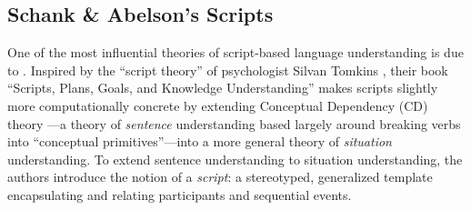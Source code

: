 \subsection{Schank \& Abelson's Scripts}
\label{sec:schank}


One of the most influential theories of script-based language understanding is due to \citet{schankandabelson}. Inspired by the ``script theory'' of psychologist Silvan Tomkins \citep{tomkins1978script}, their book ``Scripts, Plans, Goals, and Knowledge Understanding'' makes scripts slightly more computationally concrete by extending Conceptual Dependency (CD) theory \citep{schank1969conceptual}---a theory of \textit{sentence} understanding based largely around breaking verbs into ``conceptual primitives''---into a more general theory of \textit{situation} understanding. To extend sentence understanding to situation understanding, the authors introduce the notion of a \textit{script}: a stereotyped, generalized template encapsulating and relating participants and sequential events.



